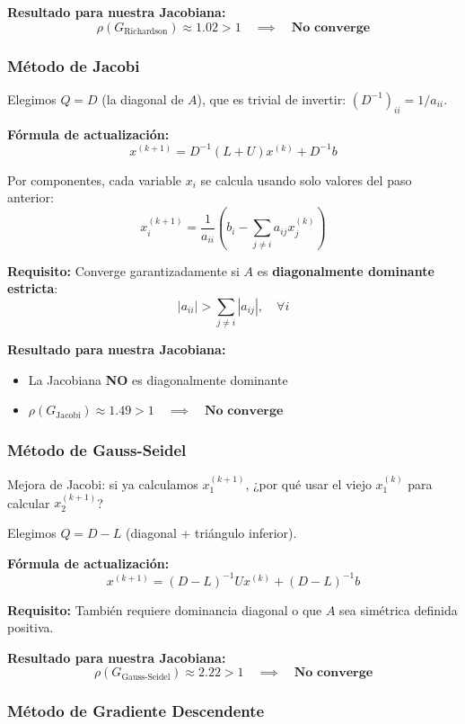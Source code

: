 \documentclass[11pt,letterpaper]{article}
\begin{document}
\textbf{Resultado para nuestra Jacobiana:}
\[
\rho(G_{\text{Richardson}}) \approx 1.02 > 1 \quad \implies \quad \textbf{No converge}
\]

\subsubsection{Método de Jacobi}

Elegimos $Q = D$ (la diagonal de $A$), que es trivial de invertir: $(D^{-1})_{ii} = 1/a_{ii}$.

\textbf{Fórmula de actualización:}
\[
x^{(k+1)} = D^{-1}(L + U)x^{(k)} + D^{-1}b
\]

Por componentes, cada variable $x_i$ se calcula usando solo valores del paso anterior:
\[
x_i^{(k+1)} = \frac{1}{a_{ii}} \left( b_i - \sum_{j \neq i} a_{ij} x_j^{(k)} \right)
\]

\textbf{Requisito:} Converge garantizadamente si $A$ es \textbf{diagonalmente dominante estricta}:
\[
|a_{ii}| > \sum_{j \neq i} |a_{ij}|, \quad \forall i
\]

\textbf{Resultado para nuestra Jacobiana:}
\begin{itemize}
    \item La Jacobiana \textbf{NO} es diagonalmente dominante
    \item $\rho(G_{\text{Jacobi}}) \approx 1.49 > 1 \quad \implies \quad \textbf{No converge}$
\end{itemize}

\subsubsection{Método de Gauss-Seidel}

Mejora de Jacobi: si ya calculamos $x_1^{(k+1)}$, ¿por qué usar el viejo $x_1^{(k)}$ para calcular $x_2^{(k+1)}$?

Elegimos $Q = D - L$ (diagonal + triángulo inferior).

\textbf{Fórmula de actualización:}
\[
x^{(k+1)} = (D - L)^{-1} U x^{(k)} + (D - L)^{-1} b
\]

\textbf{Requisito:} También requiere dominancia diagonal o que $A$ sea simétrica definida positiva.

\textbf{Resultado para nuestra Jacobiana:}
\[
\rho(G_{\text{Gauss-Seidel}}) \approx 2.22 > 1 \quad \implies \quad \textbf{No converge}
\]

\subsubsection{Método de Gradiente Descendente}
\end{document}
